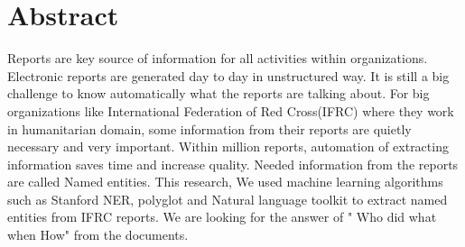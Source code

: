 \chapter*{Abstract} 

Reports are key source of information for all activities within  organizations. Electronic reports are generated day to day in
unstructured way.
It is still a big challenge to know automatically what the reports are talking about.
For big organizations like International Federation of Red Cross(IFRC)
where they work
in humanitarian domain, some information from their reports are
quietly
necessary and very important.
Within million reports, automation of extracting information saves time and
increase
quality.
Needed information from the reports are called Named entities.
This research, We
used machine learning algorithms such as
Stanford NER, polyglot and Natural language toolkit
to extract named entities from IFRC reports.
We are looking for the answer of " Who did what when How"
from the documents. 

